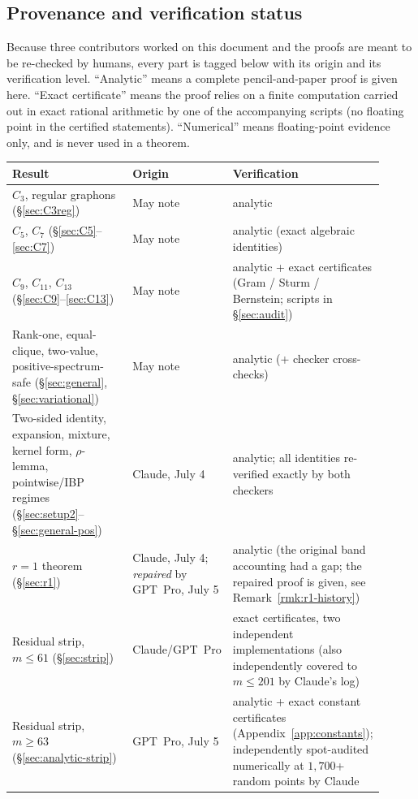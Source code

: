 \documentclass[11pt]{article}
\begin{document}
\subsection*{Provenance and verification status}

Because three contributors worked on this document and the proofs are meant to be re-checked by humans, every part is tagged below with its origin and its verification level.  ``Analytic'' means a complete pencil-and-paper proof is given here.  ``Exact certificate'' means the proof relies on a finite computation carried out in exact rational arithmetic by one of the accompanying scripts (no floating point in the certified statements).  ``Numerical'' means floating-point evidence only, and is never used in a theorem.

\begin{center}
\small
\begin{tabular}{p{0.34\linewidth}p{0.17\linewidth}p{0.4\linewidth}}
\hline
Result & Origin & Verification \\
\hline
$C_3$, regular graphons (\S\ref{sec:C3reg}) & May note & analytic \\
$C_5$, $C_7$ (\S\ref{sec:C5}--\ref{sec:C7}) & May note & analytic (exact algebraic identities) \\
$C_9$, $C_{11}$, $C_{13}$ (\S\ref{sec:C9}--\ref{sec:C13}) & May note & analytic + exact certificates (Gram / Sturm / Bernstein; scripts in \S\ref{sec:audit}) \\
Rank-one, equal-clique, two-value, positive-spectrum-safe (\S\ref{sec:general}, \S\ref{sec:variational}) & May note & analytic (+ checker cross-checks) \\
Two-sided identity, expansion, mixture, kernel form, $\rho$-lemma, pointwise/IBP regimes (\S\ref{sec:setup2}--\S\ref{sec:general-pos}) & Claude, July 4 & analytic; all identities re-verified exactly by both checkers \\
$r=1$ theorem (\S\ref{sec:r1}) & Claude, July 4; \emph{repaired} by GPT~Pro, July 5 & analytic (the original band accounting had a gap; the repaired proof is given, see Remark~\ref{rmk:r1-history}) \\
Residual strip, $m\le61$ (\S\ref{sec:strip}) & Claude/GPT~Pro & exact certificates, two independent implementations (also independently covered to $m\le201$ by Claude's log) \\
Residual strip, $m\ge63$ (\S\ref{sec:analytic-strip}) & GPT~Pro, July 5 & analytic + exact constant certificates (Appendix~\ref{app:constants}); independently spot-audited numerically at $1{,}700$+ random points by Claude \\

\end{tabular}
\end{center}
\end{document}
